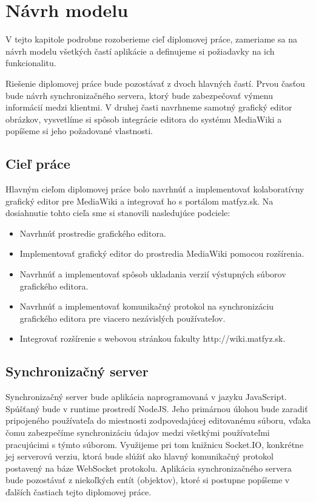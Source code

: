 \chapter{Návrh modelu}\label{chap:proposal}

V tejto kapitole podrobne rozoberieme cieľ diplomovej práce, zameriame sa na návrh modelu všetkých častí aplikácie a definujeme si požiadavky na ich funkcionalitu. 

Riešenie diplomovej práce bude pozostávať z dvoch hlavných častí. Prvou časťou bude návrh synchronizačného servera, ktorý bude zabezpečovať výmenu informácií medzi klientmi. V druhej časti navrhneme samotný grafický editor obrázkov, vysvetlíme si spôsob integrácie editora do systému MediaWiki a popíšeme si jeho požadované vlastnosti.

\section{Cieľ práce}
Hlavným cieľom diplomovej práce bolo navrhnúť a implementovať kolaboratívny grafický editor pre MediaWiki a integrovať ho s portálom matfyz.sk. Na dosiahnutie tohto cieľa sme si stanovili nasledujúce podciele:

\begin{itemize}
	\item Navrhnúť prostredie grafického editora.
	\item Implementovať grafický editor do prostredia MediaWiki pomocou rozšírenia.
	\item Navrhnúť a implementovať spôsob ukladania verzií výstupných súborov grafického editora.
	\item Navrhnúť a implementovať komunikačný protokol na synchronizáciu grafického editora pre viacero nezávislých používateľov.
	\item Integrovať rozšírenie s webovou stránkou fakulty http://wiki.matfyz.sk.
\end{itemize}

\section{Synchronizačný server}\label{sec:poziadavky_na_server}
Synchronizačný server bude aplikácia naprogramovaná v jazyku JavaScript. Spúšťaný bude v runtime prostredí NodeJS. Jeho primárnou úlohou bude zaradiť pripojeného používateľa do miestnosti zodpovedajúcej editovanému súboru, vďaka čomu zabezpečíme synchronizáciu údajov medzi všetkými používateľmi pracujúcimi s týmto súborom. Využijeme pri tom knižnicu Socket.IO, konkrétne jej serverovú verziu, ktorá bude slúžiť ako hlavný komunikačný protokol postavený na báze WebSocket protokolu. Aplikácia synchronizačného servera bude pozostávať z niekoľkých entít (objektov), ktoré si postupne popíšeme v ďalších častiach tejto diplomovej práce.

